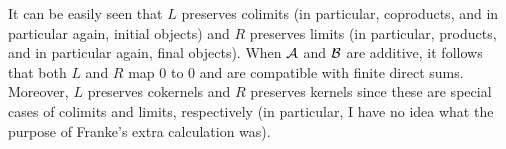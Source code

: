 \documentclass[a4paper,parskip=half,numbers=enddot, DIV=12]{scrreprt}
\begin{document}
\begin{rem}
	It can be easily seen that $L$ preserves colimits (in particular, coproducts, and in particular again, initial objects) and $R$ preserves limits (in particular, products, and in particular again, final objects). When $\mathcal{A}$ and $\mathcal{B}$ are additive, it follows that both $L$ and $R$ map $0$ to $0$ and are compatible with finite direct sums. Moreover, $L$ preserves cokernels and $R$ preserves kernels since these are special cases of colimits and limits, respectively (in particular, I have no idea what the purpose of Franke's extra calculation was).%
\end{rem}

\printbibliography
\end{document}
